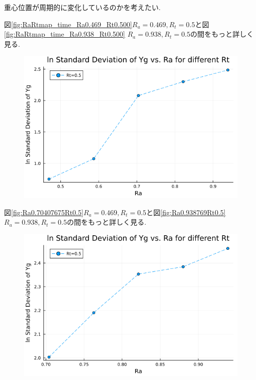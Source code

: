 重心位置が周期的に変化しているのかを考えたい.

図\ref{fig:RaRtmap_time_Ra0.469_Rt0.500}$R_a = 0.469, R_t = 0.5$と図\ref{fig:RaRtmap_time_Ra0.938_Rt0.500} $R_a = 0.938, R_t = 0.5$の間をもっと詳しく見る.



\begin{figure}[H]
  \centering
  \includegraphics[scale=0.5]{image/lnStdYg_Ra0.4693845to0.98769_Rt0.5_ti25000.png}
  \caption{}
  \label{}
\end{figure}

図\ref{fig:Ra0.70407675Rt0.5}$R_a = 0.469, R_t = 0.5$と図\ref{fig:Ra0.938769Rt0.5} $R_a = 0.938, R_t = 0.5$の間をもっと詳しく見る. 



\begin{figure}[H]
  \centering
  \includegraphics[scale=0.5]{image/lnStdYg_Ra0.70407675to0.98769_Rt0.5_ti25000.png}
  \caption{}
  \label{}
\end{figure}

